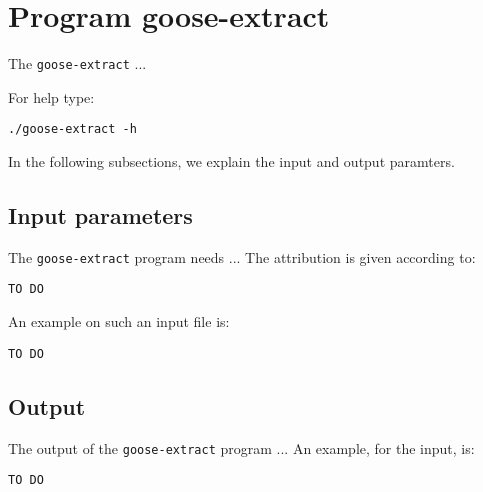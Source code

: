 \section{Program goose-extract}
The \texttt{goose-extract} ...

For help type:
\begin{lstlisting}
./goose-extract -h
\end{lstlisting}
In the following subsections, we explain the input and output paramters.

\subsection*{Input parameters}

The \texttt{goose-extract} program needs ...
The attribution is given according to:
\begin{lstlisting}
TO DO
\end{lstlisting}

An example on such an input file is:
\begin{lstlisting}
TO DO
\end{lstlisting}

\subsection*{Output}
The output of the \texttt{goose-extract} program ...
An example, for the input, is:
\begin{lstlisting}
TO DO
\end{lstlisting}